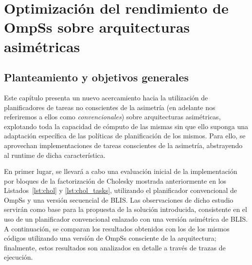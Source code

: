 \cleardoublepage

\chapter{Optimización del rendimiento de OmpSs sobre arquitecturas asimétricas}
\label{ch:chapter4}

%
%
%
%
\section{Planteamiento y objetivos generales}

Este capítulo presenta un nuevo acercamiento hacia la utilización de
planificadores de tareas no conscientes de la asimetría (en adelante nos
referiremos a ellos como {\em convencionales}) sobre arquitecturas
asimétricas, explotando toda la capacidad de cómputo de las mismas sin que
ello suponga una adaptación específica de las políticas de planificación de
los mismos. Para ello, se aprovechan implementaciones de tareas conscientes
de la asimetría, abstrayendo al runtime de dicha característica.

En primer lugar, se llevará a cabo una evaluación inicial de la
implementación por bloques de la factorización de Cholesky mostrada
anteriormente en los Listados~\ref{lst:chol} y \ref{lst:chol_tasks},
utilizando el planificador convencional de OmpSs y una versión secuencial
de BLIS. Las observaciones de dicho estudio servirán como base para la
propuesta de la solución introducida, consistente en el uso de un
planificador convencional enlazado con una versión asimétrica de BLIS. A
continuación, se comparan los resultados obtenidos con los de los mismos
códigos utilizando una versión de OmpSs consciente de la arquitectura;
finalmente, estos resultados son analizados en detalle a través de trazas
de ejecución.

